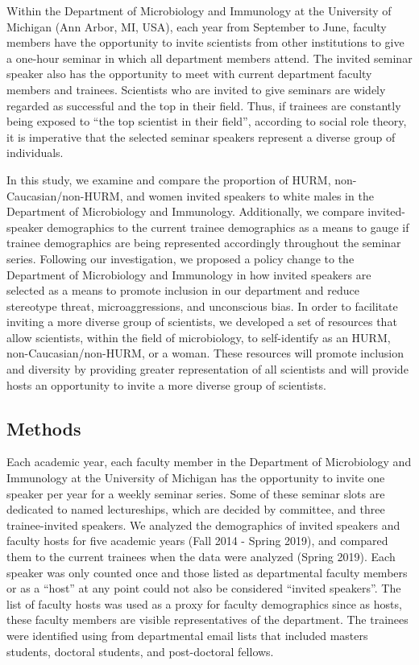 \documentclass[10pt,]{article}
\begin{document}
Within the Department of Microbiology and Immunology at the University
of Michigan (Ann Arbor, MI, USA), each year from September to June,
faculty members have the opportunity to invite scientists from other
institutions to give a one-hour seminar in which all department members
attend. The invited seminar speaker also has the opportunity to meet
with current department faculty members and trainees. Scientists who are
invited to give seminars are widely regarded as successful and the top
in their field. Thus, if trainees are constantly being exposed to ``the
top scientist in their field'', according to social role theory, it is
imperative that the selected seminar speakers represent a diverse group
of individuals.

In this study, we examine and compare the proportion of HURM,
non-Caucasian/non-HURM, and women invited speakers to white males in the
Department of Microbiology and Immunology. Additionally, we compare
invited-speaker demographics to the current trainee demographics as a
means to gauge if trainee demographics are being represented accordingly
throughout the seminar series. Following our investigation, we proposed
a policy change to the Department of Microbiology and Immunology in how
invited speakers are selected as a means to promote inclusion in our
department and reduce stereotype threat, microaggressions, and
unconscious bias. In order to facilitate inviting a more diverse group
of scientists, we developed a set of resources that allow scientists,
within the field of microbiology, to self-identify as an HURM,
non-Caucasian/non-HURM, or a woman. These resources will promote
inclusion and diversity by providing greater representation of all
scientists and will provide hosts an opportunity to invite a more
diverse group of scientists.

\subsection{Methods}\label{methods}

Each academic year, each faculty member in the Department of
Microbiology and Immunology at the University of Michigan has the
opportunity to invite one speaker per year for a weekly seminar series.
Some of these seminar slots are dedicated to named lectureships, which
are decided by committee, and three trainee-invited speakers. We
analyzed the demographics of invited speakers and faculty hosts for five
academic years (Fall 2014 - Spring 2019), and compared them to the
current trainees when the data were analyzed (Spring 2019). Each speaker
was only counted once and those listed as departmental faculty members
or as a ``host'' at any point could not also be considered ``invited
speakers''. The list of faculty hosts was used as a proxy for faculty
demographics since as hosts, these faculty members are visible
representatives of the department. The trainees were identified using
from departmental email lists that included masters students, doctoral
students, and post-doctoral fellows.
\end{document}
